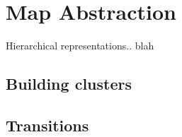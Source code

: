 \section{Map Abstraction}
Hierarchical representations.. blah

\subsection{Building clusters}

\subsection{Transitions}
